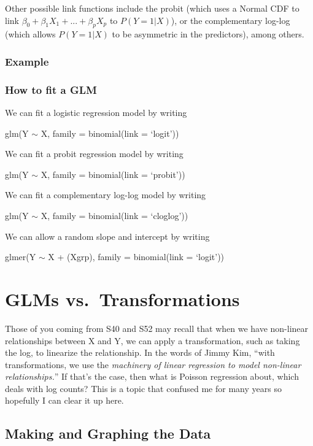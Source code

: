 \documentclass[
  letterpaper,
  DIV=11,
  numbers=noendperiod]{scrreprt}
\begin{document}
Other possible link functions include the probit (which uses a Normal
CDF to link \(\beta_0 + \beta_1X_1 + ... + \beta_pX_p\) to
\(P(Y=1|X)\)), or the complementary log-log (which allows \(P(Y = 1|X)\)
to be asymmetric in the predictors), among others.

\hypertarget{example}{%
\subsection{Example}\label{example}}

\hypertarget{how-to-fit-a-glm}{%
\subsection{How to fit a GLM}\label{how-to-fit-a-glm}}

We can fit a logistic regression model by writing

glm(Y \(\sim\) X, family = binomial(link = `logit'))

We can fit a probit regression model by writing

glm(Y \(\sim\) X, family = binomial(link = `probit'))

We can fit a complementary log-log model by writing

glm(Y \(\sim\) X, family = binomial(link = `cloglog'))

We can allow a random slope and intercept by writing

glmer(Y \(\sim\) X + (X\textbar grp), family = binomial(link = `logit'))

\hypertarget{glms-vs.-transformations}{%
\chapter{GLMs vs.~Transformations}\label{glms-vs.-transformations}}

Those of you coming from S40 and S52 may recall that when we have
non-linear relationships between X and Y, we can apply a transformation,
such as taking the log, to linearize the relationship. In the words of
Jimmy Kim, ``with transformations, we use the \emph{machinery of linear
regression to model non-linear relationships.}'' If that's the case,
then what is Poisson regression about, which deals with log counts? This
is a topic that confused me for many years so hopefully I can clear it
up here.

\hypertarget{making-and-graphing-the-data}{%
\section{Making and Graphing the
Data}\label{making-and-graphing-the-data}}
\end{document}
